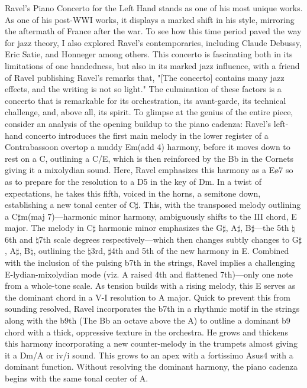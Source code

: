\documentclass[11pt,a4paper]{article}
\begin{document}
Ravel’s Piano Concerto for the Left Hand stands as one of his most unique works. As one of his post-WWI works, it displays a marked shift in his style, mirroring the aftermath of France after the war.\autocite[100]{Orenstein} 
To see how this time period paved the way for jazz theory, I also explored Ravel's contemporaries, including Claude Debussy, Eric Satie, and Honneger among others. 
This concerto is fascinating both in its limitations of one handedness, but also in its marked jazz influence, with a friend of Ravel publishing Ravel's remarks that, "[The concerto] contains many jazz effects, and the writing is not so light."\autocite{1933} The culmination of these factors is a concerto that is remarkable for its orchestration, its avant-garde, its technical challenge, and, above all, its spirit.
 To glimpse at the genius of the entire piece, consider an analysis of the opening buildup to the piano cadenza: Ravel’s left-hand concerto introduces the first main melody in the lower register of a Contrabassoon overtop a muddy Em(add 4) harmony, before it moves down to rest on a C, outlining a C/E, which is then reinforced by the Bb in the Cornets giving it a mixolydian sound. Here, Ravel emphasizes this harmony as a Eø7 so as to prepare for the resolution to a D5 in the key of Dm. In a twist of expectations, he takes this fifth, voiced in the horns, a semitone down, establishing a new tonal center of C$\sharp$. This, with the transposed melody outlining a C$\sharp$m(maj 7)—harmonic minor harmony, ambiguously shifts to the III chord, E major. The melody in C$\sharp$ harmonic minor emphasizes the G$\sharp$, A$\sharp$, B$\sharp$—the 5th $\natural$6th and $\natural$7th scale degrees respectively—which then changes subtly changes to G$\sharp$, A$\sharp$, B$\natural$, outlining the $\natural$3rd, $\sharp$4th and 5th of the new harmony in E. Combined with the inclusion of the pulsing b7th in the strings, Ravel implies a challenging E-lydian-mixolydian mode (viz. A raised 4th and flattened 7th)—only one note from a whole-tone scale. As tension builds with a rising melody, this E serves as the dominant chord in a V-I resolution to A major. Quick to prevent this from sounding resolved, Ravel incorporates the b7th in a rhythmic motif in the strings along with the b9th (The Bb an octave above the A) to outline a dominant b9 chord with a thick, oppressive texture in the orchestra. He grows and thickens this harmony incorporating a new counter-melody in the trumpets almost giving it a Dm/A or iv/i sound. This grows to an apex with a fortissimo Asus4 with a dominant function. Without resolving the dominant harmony, the piano cadenza begins with the same tonal center of A.\autocite{ravel}
\end{document}
